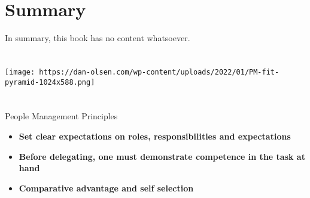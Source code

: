 \documentclass[
  letterpaper,
  DIV=11,
  numbers=noendperiod]{scrreprt}
\providecommand{\tightlist}{%
  \setlength{\itemsep}{0pt}\setlength{\parskip}{0pt}}\usepackage{longtable,booktabs,array}
\begin{document}

\hypertarget{summary}{%
\chapter{Summary}\label{summary}}

In summary, this book has no content whatsoever.


\hypertarget{section}{%
\chapter{}\label{section}}

\texttt{[image: https://dan-olsen.com/wp-content/uploads/2022/01/PM-fit-pyramid-1024x588.png]}


\hypertarget{section-1}{%
\chapter{}\label{section-1}}


\hypertarget{section-2}{%
\chapter{}\label{section-2}}

People Management Principles

\begin{itemize}
\tightlist
\item
  \textbf{Set clear expectations on roles, responsibilities and
  expectations}
\item
  \textbf{Before delegating, one must demonstrate competence in the task
  at hand}
\item
  \textbf{Comparative advantage and self selection}
\end{itemize}


\hypertarget{section-3}{%
\chapter{}\label{section-3}}


\hypertarget{section-4}{%
\chapter{}\label{section-4}}
\end{document}
